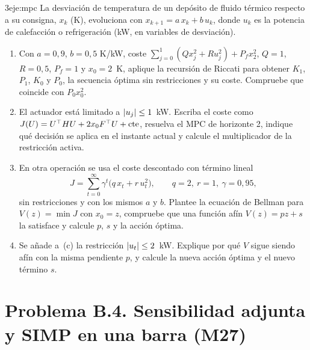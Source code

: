 \begin{ejercicio}{3}{eje:mpc}
La desviación de temperatura de un depósito de fluido térmico respecto a su consigna, $x_k$ (K), evoluciona con $x_{k+1}=a\,x_k+b\,u_k$, donde $u_k$ es la potencia de calefacción o refrigeración (kW, en variables de desviación).
\begin{enumerate}[label=(\alph*)]
  \item {} Con $a=0{,}9$, $b=0{,}5$ K/kW, coste $\sum_{j=0}^{1}(Qx_j^{2}+Ru_j^{2})+P_fx_2^{2}$, $Q=1$, $R=0{,}5$, $P_f=1$ y $x_0=2$~K, aplique la recursión de Riccati para obtener $K_1$, $P_1$, $K_0$ y $P_0$, la secuencia óptima sin restricciones y su coste. Compruebe que coincide con $P_0x_0^{2}$.
  \item {} El actuador está limitado a $\lvert u_j\rvert\le 1$~kW. Escriba el coste como $J(U)=U^{\top} HU+2x_0F^{\top} U+\text{cte}$, resuelva el MPC de horizonte 2, indique qué decisión se aplica en el instante actual y calcule el multiplicador de la restricción activa.
  \item {} En otra operación se usa el coste descontado con término lineal
  \[
  J=\sum_{t=0}^{\infty}\gamma^{t}\bigl(q\,x_t+r\,u_t^{2}\bigr),\qquad q=2,\ r=1,\ \gamma=0{,}95,
  \]
  sin restricciones y con los mismos $a$ y $b$. Plantee la ecuación de Bellman para $V(z)=\min J$ con $x_0=z$, compruebe que una función afín $V(z)=pz+s$ la satisface y calcule $p$, $s$ y la acción óptima.
  \item {} Se añade a~(c) la restricción $\lvert u_t\rvert\le 2$~kW. Explique por qué $V$ sigue siendo afín con la misma pendiente $p$, y calcule la nueva acción óptima y el nuevo término $s$.
\end{enumerate}
\end{ejercicio}

\section*{Problema B.4. Sensibilidad adjunta y SIMP en una barra (M27)}

